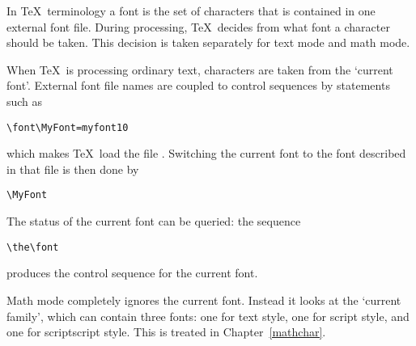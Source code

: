 \documentclass{book}
\begin{document}
In  \TeX\ terminology a font is the set of characters that
is contained in one external font file.
During processing, \TeX\ decides from
what font a character should be taken. This decision is
taken separately for text mode and math mode.

When \TeX\ is processing ordinary text, characters are taken
from the `current font'.
External font file names are coupled to  control sequences
by   statements such as
\begin{verbatim}
\font\MyFont=myfont10
\end{verbatim}
which makes \TeX\ load the file .
Switching the current font to the font described in that file
is then done by
\begin{verbatim}
\MyFont
\end{verbatim}
The status of the current font
can be queried: the sequence
\begin{verbatim}
\the\font
\end{verbatim}
produces the control sequence for the current font.

Math mode completely ignores the current font. Instead
it looks  at the `current family', which can contain
three fonts: one for text style, one for script style,
and one for scriptscript style. This is treated
in Chapter~\ref{mathchar}.
\end{document}

